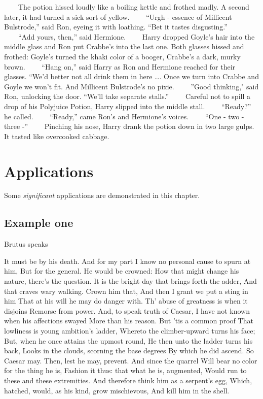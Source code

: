 \documentclass[]{book}
\begin{document}
　　The potion hissed loudly like a boiling kettle and frothed madly. A
second later, it had turned a sick sort of yellow. 　　``Urgh - essence
of Millicent Bulstrode,'' said Ron, eyeing it with loathing. ``Bet it
tastes disgusting.'' 　　``Add yours, then,'' said Hermione. 　　Harry
dropped Goyle's hair into the middle glass and Ron put Crabbe's into the
last one. Both glasses hissed and frothed: Goyle's turned the khaki
color of a booger, Crabbe's a dark, murky brown. 　　``Hang on,'' said
Harry as Ron and Hermione reached for their glasses. ``We'd better not
all drink them in here \ldots{}. Once we turn into Crabbe and Goyle we
won't fit. And Millicent Bulstrode's no pixie. 　　''Good thinking,"
said Ron, unlocking the door. ``We'll take separate stalls.''
　　Careful not to spill a drop of his Polyjuice Potion, Harry slipped
into the middle stall. 　　``Ready?'' he called. 　　``Ready,'' came
Ron's and Hermione's voices. 　　``One - two - three -'' 　　Pinching
his nose, Harry drank the potion down in two large gulps. It tasted like
overcooked cabbage.

\hypertarget{applications}{%
\chapter{Applications}\label{applications}}

Some \emph{significant} applications are demonstrated in this chapter.

\hypertarget{example-one}{%
\section{Example one}\label{example-one}}

Brutus speaks \citep{mphillips_julius_2017}

It must be by his death. And for my part I know no personal cause to
spurn at him, But for the general. He would be crowned: How that might
change his nature, there's the question. It is the bright day that
brings forth the adder, And that craves wary walking. Crown him that,
And then I grant we put a sting in him That at his will he may do danger
with. Th' abuse of greatness is when it disjoins Remorse from power.
And, to speak truth of Caesar, I have not known when his affections
swayed More than his reason. But 'tis a common proof That lowliness is
young ambition's ladder, Whereto the climber-upward turns his face; But,
when he once attains the upmost round, He then unto the ladder turns his
back, Looks in the clouds, scorning the base degrees By which he did
ascend. So Caesar may. Then, lest he may, prevent. And since the quarrel
Will bear no color for the thing he is, Fashion it thus: that what he
is, augmented, Would run to these and these extremities. And therefore
think him as a serpent's egg, Which, hatched, would, as his kind, grow
mischievous, And kill him in the shell.
\end{document}
